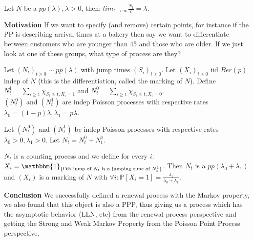 \begin{theorem}
Let $N$ be a $pp(\lambda), \lambda > 0$, then: $lim_{t \to \infty} \frac{N_t}{t}=\lambda$.
\end{theorem}

\textbf{Motivation} If we want to specify (and remove) certain points, for instance if the PP is describing arrival times at a bakery then say we want to differentiate between customers who are younger than 45 and those who are older. If we just look at one of these groups, what type of process are they?

\begin{theorem}[Thinning]
	Let $(N_t)_{t\geq 0} \sim pp(\lambda)$ with jump times $(S_i)_{i\geq 0}$. Let $(X_i)_{i\geq 0}$ iid $Ber(p)$ indep of $N$ (this is the differentiation, called the marking of $N$). Define $N_t^1 = \sum_{i\geq 1}^{} \chi_{S_i \leq t, X_i = 1}$ and $N_t^0 = \sum_{i \geq 1}^{} \chi_{S_i \leq t, X_i = 0}$.
\\ \noindent	
	$(N_t^0)$ and  $(N_t^1)$ are indep Poisson processes with respective rates  $\lambda_0 = (1-p)\lambda, \lambda _1=p\lambda $.
\end{theorem}

Let $(N_t^0)$ and $(N_t^1)$ be indep Poisson processes with respective rates $\lambda_0> 0, \lambda_1> 0$. Let $N_t = N_t^0 + N_t^1$.
\begin{theorem}[]
$N_t$ is a counting process and we define for every $i $: $X_i = \mathbbm{1}_{\textrm{\{i'th jump of }N_t\textrm{ is a jumping time of }N_t^1\}}$. Then  $N_t$ is a $pp(\lambda_0 + \lambda_1)$ and  $(X_i)$ is a marking of  $N$ with $\forall i: \mathbb{P}_{} \left[ X_i=1 \right] = \frac{\lambda_1}{\lambda_0+\lambda_1}$.
\end{theorem}

\noindent \textbf{Conclusion} We successfully defined a renewal process with the Markov property, we also found that this object is also a PPP, thus giving us a process which has the asymptotic behavior (LLN, etc) from the renewal process perspective and getting the Strong and Weak Markov Property from the Poisson Point Process perspective. 


